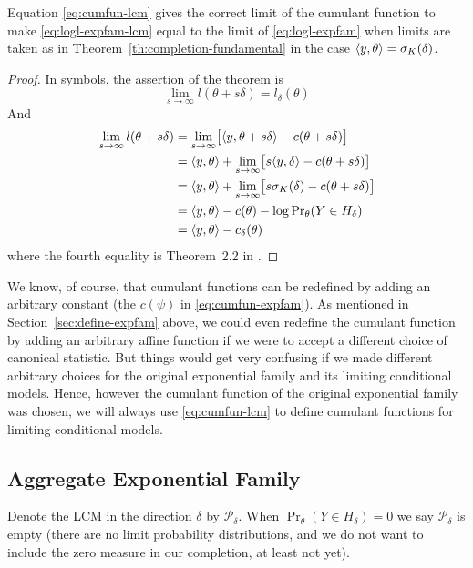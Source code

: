 \begin{theorem} \label{th:cumfun-lcm}
Equation \eqref{eq:cumfun-lcm} gives the correct limit of the cumulant function
to make \eqref{eq:logl-expfam-lcm} equal to the limit of \eqref{eq:logl-expfam}
when limits are taken as in Theorem~\ref{th:completion-fundamental}
in the case $\langle y, \theta \rangle = \sigma_K(\delta)$.
\end{theorem}
\begin{proof}
In symbols, the assertion of the theorem is
$$
   \lim_{s \to \infty} l(\theta + s \delta)
   =
   l_\delta(\theta)
$$
And
\begin{align*}
   \lim_{s \to \infty} l(\theta + s \delta)
   & =
   \lim_{s \to \infty}
   \bigl[ \langle y, \theta + s \delta \rangle - c(\theta + s \delta) \bigr]
   \\
   & =
   \langle y, \theta \rangle + \lim_{s \to \infty}
   \bigl[ s \langle y, \delta \rangle - c(\theta + s \delta) \bigr]
   \\
   & =
   \langle y, \theta \rangle + \lim_{s \to \infty}
   \bigl[ s \sigma_K(\delta) - c(\theta + s \delta) \bigr]
   \\
   & =
   \langle y, \theta \rangle - c(\theta) - \log \Pr\nolimits_\theta(Y \in H_\delta)
   \\
   & =
   \langle y, \theta \rangle - c_\delta(\theta)
\end{align*}
where the fourth equality is Theorem~{2.2} in \citet{geyer-thesis}.
\end{proof}

We know, of course, that cumulant functions can be redefined by adding an
arbitrary constant (the $c(\psi)$ in \eqref{eq:cumfun-expfam}).
As mentioned in Section~\ref{sec:define-expfam} above, we could even redefine
the cumulant function by adding an arbitrary affine function if we were to
accept a different choice of canonical statistic.  But things would get
very confusing if we made different arbitrary choices for the original
exponential family and its limiting conditional models.  Hence, however
the cumulant function of the original exponential family was chosen, we
will always use \eqref{eq:cumfun-lcm} to define cumulant functions
for limiting conditional models.

\subsection{Aggregate Exponential Family}

Denote the LCM in the direction $\delta$ by $\mathcal{P}_\delta$.
When $\Pr_\theta(Y \in H_\delta) = 0$ we say $\mathcal{P}_\delta$ is empty
(there are no limit probability distributions, and we do not want to include
the zero measure in our completion, at least not yet).


